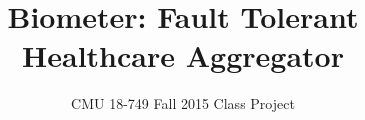 \documentclass{sig-alternate-nocopyright}
\begin{document}
%

\subtitle{CMU 18-749 Fall 2015 Class Project}
\title{Biometer: Fault Tolerant Healthcare Aggregator}
%
%
%
%
%
\end{document}
